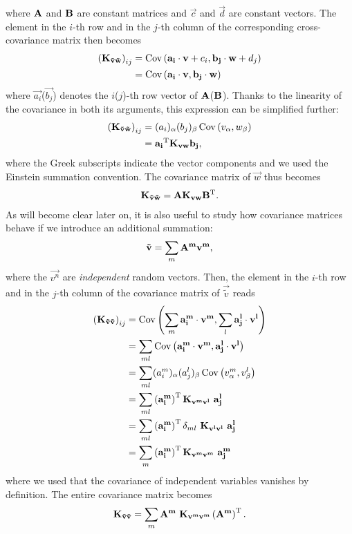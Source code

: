 \documentclass[12pt,a4paper]{scrarticle}
\begin{document}
where $\mathbf{A}$ and $\mathbf{B}$ are constant matrices and $\vec{c}$ and $\vec{d}$ are constant vectors.
%
The element in the $i$-th row and in the $j$-th column of the corresponding cross-covariance matrix then becomes
\begin{align*}
    \left(\mathbf{K}_{\mathbf{\tilde{v}} \mathbf{\tilde{w}}}\right)_{ij} 
        &= \operatorname{Cov} \left( \mathbf{a_i}\cdot\mathbf{v}+c_i, \mathbf{b_j}\cdot\mathbf{w}+d_j \right) \\
        &= \operatorname{Cov} \left( \mathbf{a_i}\cdot\mathbf{v}, \mathbf{b_j}\cdot\mathbf{w} \right)
\end{align*}
where $\vec{a_i}$($\vec{b_j}$) denotes the $i$($j$)-th row vector of $\mathbf{A}$($\mathbf{B}$). Thanks to the linearity of the covariance in both its arguments, this expression can be simplified further:
\begin{align*}
    \left(\mathbf{K}_{\mathbf{\tilde{v}} \mathbf{\tilde{w}}}\right)_{ij} 
        &= (a_i)_\alpha (b_j)_\beta \operatorname{Cov} \left( v_\alpha, w_\beta \right) \\
        &= \mathbf{a_i}^{\mathrm{T}} \mathbf{K}_{\mathbf{v} \mathbf{w}} \mathbf{b_j},
\end{align*}
where the Greek subscripts indicate the vector components and we used the Einstein summation convention. The covariance matrix of $\vec{w}$ thus becomes 
\begin{align}
\label{eq:crosscovlintraf}
    \mathbf{K}_{\mathbf{\tilde{v}} \mathbf{\tilde{w}}} = \mathbf{A} \mathbf{K}_{\mathbf{v} \mathbf{w}} \mathbf{B}^{\mathrm{T}}.
\end{align}
%
As will become clear later on, it is also useful to study how covariance matrices behave if we introduce an additional summation:
\begin{align*}
    \mathbf{\tilde{v}} = \sum_m \mathbf{A^m} \mathbf{v^m},
\end{align*}
%
where the $\vec{v^n}$ are \textit{independent} random vectors. Then, the element in the $i$-th row and in the $j$-th column of the covariance matrix of $\vec{\tilde{v}}$ reads
\begin{align*}
    \left(\mathbf{K}_{\mathbf{\tilde{v}} \mathbf{\tilde{v}}}\right)_{ij} 
        &= \operatorname{Cov} \left( \sum_m\mathbf{a_i^m}\cdot\mathbf{v^m}, \sum_l\mathbf{a_j^l}\cdot\mathbf{v^l} \right) \\
        &= \sum_{m l} \operatorname{Cov} \left( \mathbf{a_i^m}\cdot\mathbf{v^m}, \mathbf{a_j^l}\cdot\mathbf{v^l} \right) \\
        &= \sum_{m l} (a_i^m)_\alpha (a_j^l)_\beta \operatorname{Cov} \left( v_\alpha^m, v_\beta^l \right) \\
        &= \sum_{m l} \left(\mathbf{a_i^m}\right)^{\mathrm{T}} \mathbf{K}_{\mathbf{\mathbf{v^m}} \mathbf{\mathbf{v^l}}} \ \mathbf{a_j^l} \\
        &= \sum_{m l} \left(\mathbf{a_i^m}\right)^{\mathrm{T}} \delta_{m l} \ \mathbf{K}_{\mathbf{\mathbf{v^l}} \mathbf{\mathbf{v^l}}} \ \mathbf{a_j^l} \\
        &= \sum_{m} \left(\mathbf{a_i^m}\right)^{\mathrm{T}} \mathbf{K}_{\mathbf{\mathbf{v^m}} \mathbf{\mathbf{v^m}}} \ \mathbf{a_j^m}
\end{align*}
where we used that the covariance of independent variables vanishes by definition. The entire covariance matrix becomes 
\begin{align}
\label{eq:covlintraf}
    \mathbf{K}_{\mathbf{\tilde{v}} \mathbf{\tilde{v}}} = \sum_{m} \mathbf{A^m} \ \mathbf{K}_{\mathbf{\mathbf{v^m}} \mathbf{\mathbf{v^m}}} \left(\mathbf{A^m}\right)^{\mathrm{T}}.
\end{align}
%
%
\end{document}
